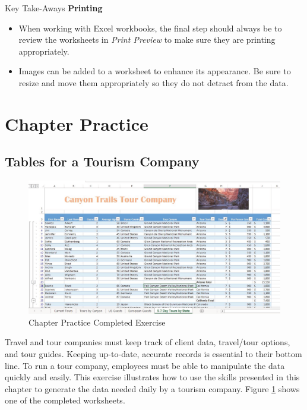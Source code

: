 \begin{center}
	\begin{tkwbox}{Key Take-Aways}
		\textbf{Printing}
		\\
		\begin{itemize}
			\setlength{\itemsep}{0pt}
			\setlength{\parskip}{0pt}
			\setlength{\parsep}{0pt}

			\item When working with Excel workbooks, the final step should always be to review the worksheets in \textit{Print Preview} to make sure they are printing appropriately.
			\item Images can be added to a worksheet to enhance its appearance. Be sure to resize and move them appropriately so they do not detract from the data.

		\end{itemize}
	\end{tkwbox}
\end{center}

\section{Chapter Practice}

\subsection{Tables for a Tourism Company}

\begin{figure}[H]
	\centering
	\includegraphics[width=\maxwidth{.95\linewidth}]{gfx/ch05_fig30}
	\caption{Chapter Practice Completed Exercise}
	\label{05:fig30}
\end{figure}

Travel and tour companies must keep track of client data, travel/tour options, and tour guides. Keeping up-to-date, accurate records is essential to their bottom line. To run a tour company, employees must be able to manipulate the data quickly and easily. This exercise illustrates how to use the skills presented in this chapter to generate the data needed daily by a tourism company. Figure \ref{05:fig30} shows one of the completed worksheets.

